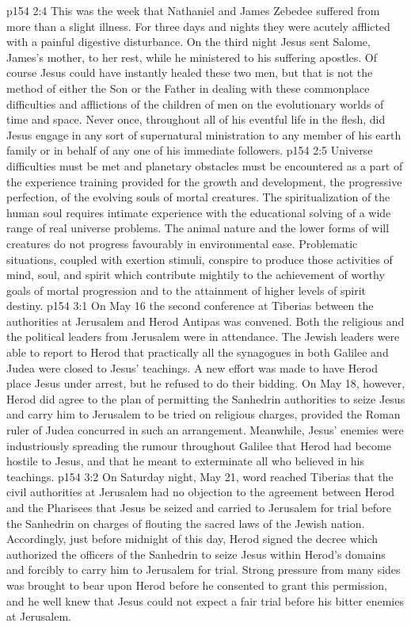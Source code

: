 \vs p154 2:4 \pc This was the week that Nathaniel and James Zebedee suffered from more than a slight illness. For three days and nights they were acutely afflicted with a painful digestive disturbance. On the third night Jesus sent Salome, James’s mother, to her rest, while he ministered to his suffering apostles. Of course Jesus could have instantly healed these two men, but that is not the method of either the Son or the Father in dealing with these commonplace difficulties and afflictions of the children of men on the evolutionary worlds of time and space. Never once, throughout all of his eventful life in the flesh, did Jesus engage in any sort of supernatural ministration to any member of his earth family or in behalf of any one of his immediate followers.
\vs p154 2:5 Universe difficulties must be met and planetary obstacles must be encountered as a part of the experience training provided for the growth and development, the progressive perfection, of the evolving souls of mortal creatures. The spiritualization of the human soul requires intimate experience with the educational solving of a wide range of real universe problems. The animal nature and the lower forms of will creatures do not progress favourably in environmental ease. Problematic situations, coupled with exertion stimuli, conspire to produce those activities of mind, soul, and spirit which contribute mightily to the achievement of worthy goals of mortal progression and to the attainment of higher levels of spirit destiny.
\vs p154 3:1 On May 16 the second conference at Tiberias between the authorities at Jerusalem and Herod Antipas was convened. Both the religious and the political leaders from Jerusalem were in attendance. The Jewish leaders were able to report to Herod that practically all the synagogues in both Galilee and Judea were closed to Jesus’ teachings. A new effort was made to have Herod place Jesus under arrest, but he refused to do their bidding. On May 18, however, Herod did agree to the plan of permitting the Sanhedrin authorities to seize Jesus and carry him to Jerusalem to be tried on religious charges, provided the Roman ruler of Judea concurred in such an arrangement. Meanwhile, Jesus’ enemies were industriously spreading the rumour throughout Galilee that Herod had become hostile to Jesus, and that he meant to exterminate all who believed in his teachings.
\vs p154 3:2 On Saturday night, May 21, word reached Tiberias that the civil authorities at Jerusalem had no objection to the agreement between Herod and the Pharisees that Jesus be seized and carried to Jerusalem for trial before the Sanhedrin on charges of flouting the sacred laws of the Jewish nation. Accordingly, just before midnight of this day, Herod signed the decree which authorized the officers of the Sanhedrin to seize Jesus within Herod’s domains and forcibly to carry him to Jerusalem for trial. Strong pressure from many sides was brought to bear upon Herod before he consented to grant this permission, and he well knew that Jesus could not expect a fair trial before his bitter enemies at Jerusalem.

